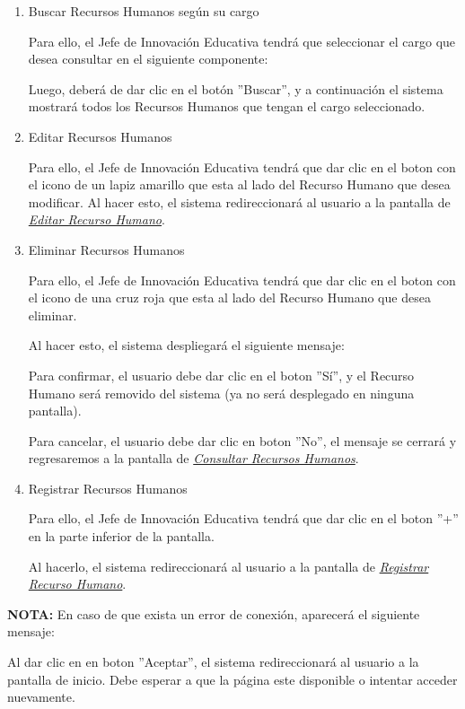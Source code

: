 \begin{enumerate}
	\item Buscar Recursos Humanos según su cargo

	Para ello, el Jefe de Innovación Educativa tendrá que seleccionar el cargo que desea consultar en el siguiente componente:

	Luego, deberá de dar clic en el botón ''Buscar'', y a continuación el sistema mostrará todos los Recursos Humanos que tengan el cargo seleccionado.

	\item Editar Recursos Humanos

	Para ello, el Jefe de Innovación Educativa tendrá que dar clic en el boton con el icono de un lapiz amarillo que esta al lado del Recurso Humano que desea modificar. Al hacer esto, el sistema redireccionará al usuario a la pantalla de \hyperlink{editarrh}{\textit{Editar Recurso Humano}}.

	\item Eliminar Recursos Humanos

	Para ello, el Jefe de Innovación Educativa tendrá que dar clic en el boton con el icono de una cruz roja que esta al lado del Recurso Humano que desea eliminar. 

	Al hacer esto, el sistema despliegará el siguiente mensaje:

	Para confirmar, el usuario debe dar clic en el boton ''Sí'', y el Recurso Humano será removido del sistema (ya no será desplegado en ninguna pantalla).

	Para cancelar, el usuario debe dar clic en boton ''No'', el mensaje se cerrará y regresaremos a la pantalla de \hyperlink{consultarrh}{\textit{Consultar Recursos Humanos}}.

	\item Registrar Recursos Humanos

	Para ello, el Jefe de Innovación Educativa tendrá que dar clic en el boton ''+'' en la parte inferior de la pantalla.

	Al hacerlo, el sistema redireccionará al usuario a la pantalla de \hyperlink{registrarrh}{\textit{Registrar Recurso Humano}}.
\end{enumerate}

\textbf{NOTA:} En caso de que exista un error de conexión, aparecerá el siguiente mensaje:

Al dar clic en en boton ''Aceptar'', el sistema redireccionará al usuario a la pantalla de inicio. Debe esperar a que la página este disponible o intentar acceder nuevamente.

